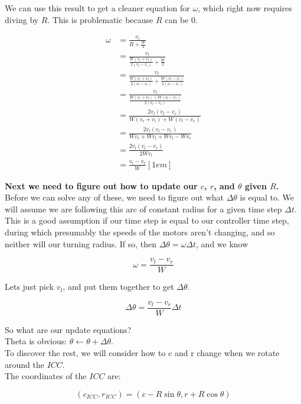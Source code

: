 \documentclass{article}
\begin{document}
We can use this result to get a cleaner equation for $\omega$, which right now requires diving by $R$. This is problematic because $R$ can be $0$.

\begin{align*}
  \omega &= \frac{v_l}{R+\frac{W}{2}}\\[1em]
         &= \frac{v_l}{\frac{W(v_r+v_l)}{2(v_l - v_r)}+\frac{W}{2}}\\[1em]
         &= \frac{v_l}{\frac{W(v_r+v_l)}{2(v_l - v_r)}+\frac{W(v_l - v_r)}{2(v_l - v_r)}}\\[1em]
         &= \frac{v_l}{\frac{W(v_r+v_l)+W(v_l - v_r)}{2(v_l - v_r)}}\\[1em]
         &= \frac{2v_l(v_l - v_r)}{W(v_r+v_l)+W(v_l - v_r)}\\[1em]
         &= \frac{2v_l(v_l - v_r)}{Wv_r+Wv_l+Wv_l-Wv_r}\\[1em]
         &= \frac{2v_l(v_l - v_r)}{2Wv_l}\\[1em]
         &= \frac{v_l - v_r}{W} [1em]
\end{align*}


\textbf{Next we need to figure out how to update our $c$, $r$, and $\theta$ given $R$.} \\

Before we can solve any of these, we need to figure out what $\Delta\theta$ is equal to. We will assume we are following this arc of constant radius for a given time step $\Delta t$. This is a good assumption if our time step is equal to our controller time step, during which presumably the speeds of the motors aren't changing, and so neither will our turning radius. If so, then $\Delta\theta = \omega\Delta t$, and we know

$$\omega=\frac{v_l - v_r}{W}$$

Lets just pick $v_l$, and put them together to get $\Delta\theta$.

$$\Delta\theta = \frac{v_l - v_r}{W}\Delta t$$

So what are our update equations? \\

Theta is obvious: $\theta \leftarrow \theta+\Delta\theta$. \\

To discover the rest, we will consider how to c and r change when we rotate around the $ICC$. \\

The coordinates of the $ICC$ are:

$$(c_{ICC}, r_{ICC}) = (c-R\sin{\theta}, r+R\cos{\theta})$$
\end{document}
